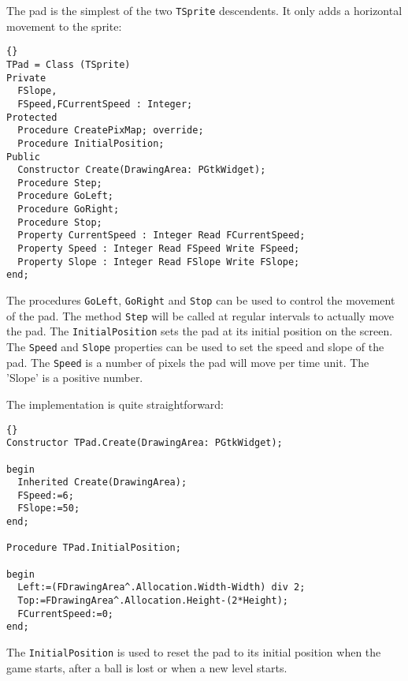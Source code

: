 \documentclass[10pt]{article}
\newcommand{\var}[1]{\texttt{#1}}
\begin{document}
The pad is the simplest of the two \var{TSprite} descendents. It only adds a
horizontal movement to the sprite:
\begin{lstlisting}{}
TPad = Class (TSprite)
Private
  FSlope,
  FSpeed,FCurrentSpeed : Integer;
Protected
  Procedure CreatePixMap; override;
  Procedure InitialPosition; 
Public  
  Constructor Create(DrawingArea: PGtkWidget);
  Procedure Step;
  Procedure GoLeft;
  Procedure GoRight;
  Procedure Stop;
  Property CurrentSpeed : Integer Read FCurrentSpeed;
  Property Speed : Integer Read FSpeed Write FSpeed;
  Property Slope : Integer Read FSlope Write FSlope;
end;
\end{lstlisting}{}
The procedures \var{GoLeft}, \var{GoRight} and \var{Stop} can be used to
control the movement of the pad. The method \var{Step} will be called at
regular intervals to actually move the pad. The \var{InitialPosition} 
sets the pad at its initial position on the screen. The \var{Speed} and 
\var{Slope} properties can be used to set the speed and slope of the pad.
The \var{Speed} is a number of pixels the pad will move per time unit.
The 'Slope' is a positive number. 

The implementation is quite straightforward:
\begin{lstlisting}{}
Constructor TPad.Create(DrawingArea: PGtkWidget);

begin
  Inherited Create(DrawingArea);
  FSpeed:=6;
  FSlope:=50;
end;

Procedure TPad.InitialPosition;

begin
  Left:=(FDrawingArea^.Allocation.Width-Width) div 2;
  Top:=FDrawingArea^.Allocation.Height-(2*Height);
  FCurrentSpeed:=0;
end;
\end{lstlisting}{}
The \var{InitialPosition} is used to reset the pad to its initial position
when the game starts, after a ball is lost or when a new level starts.
\end{document}
